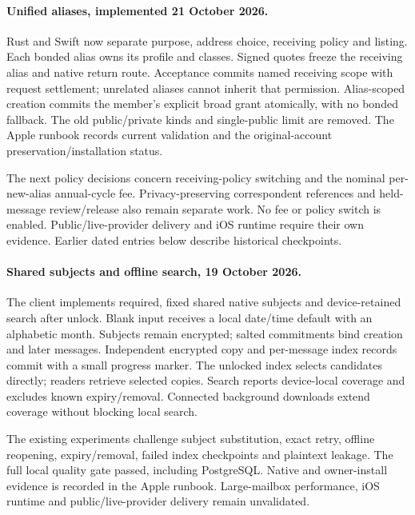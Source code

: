 \documentclass[11pt]{article}
\begin{document}
\paragraph{Unified aliases, implemented 21 October 2026.}
Rust and Swift now separate purpose, address choice, receiving policy and listing.
Each bonded alias owns its profile and classes. Signed quotes freeze the receiving
alias and native return route. Acceptance commits named receiving scope with request
settlement; unrelated aliases cannot inherit that permission. Alias-scoped creation
commits the member's explicit broad grant atomically, with no bonded fallback.
The old public/private kinds and single-public limit are removed. The Apple runbook
records current validation and the original-account preservation/installation status.

The next policy decisions concern receiving-policy switching and the nominal
per-new-alias annual-cycle fee. Privacy-preserving correspondent references and
held-message review/release also remain separate work. No fee or policy switch is
enabled. Public/live-provider delivery and iOS runtime require their own evidence.
Earlier dated entries below describe historical checkpoints.

\paragraph{Shared subjects and offline search, 19 October 2026.}
The client implements required, fixed shared native subjects and device-retained
search after unlock. Blank input receives a local date/time default with an
alphabetic month. Subjects remain encrypted; salted commitments bind creation and
later messages. Independent encrypted copy and per-message index records commit with a small
progress marker. The unlocked index selects candidates directly; readers retrieve
selected copies. Search reports device-local coverage and excludes known expiry/removal.
Connected background downloads extend coverage without blocking local search.

The existing experiments challenge subject substitution, exact retry, offline
reopening, expiry/removal, failed index checkpoints and plaintext leakage. The full
local quality gate passed, including PostgreSQL. Native and owner-install evidence
is recorded in the Apple runbook. Large-mailbox performance, iOS runtime and
public/live-provider delivery remain unvalidated.
\end{document}
